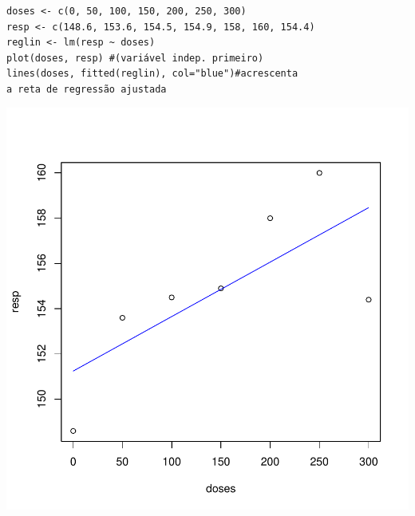 \documentclass[14pt,aspectratio=1610]{beamer}
\begin{document}
\begin{frame}[fragile]{}
\frametitle{ }
\begin{block}{}
\begin{center}
\begin{verbatim}
doses <- c(0, 50, 100, 150, 200, 250, 300)
resp <- c(148.6, 153.6, 154.5, 154.9, 158, 160, 154.4)
reglin <- lm(resp ~ doses) 
plot(doses, resp) #(variável indep. primeiro)
lines(doses, fitted(reglin), col="blue")#acrescenta 
a reta de regressão ajustada
\end{verbatim}
\end{center}
\end{block}
\vspace{-1.3cm}
\begin{center}
\includegraphics{Figuras/Aula20-004}
\end{center}
\end{frame}
\end{document}
